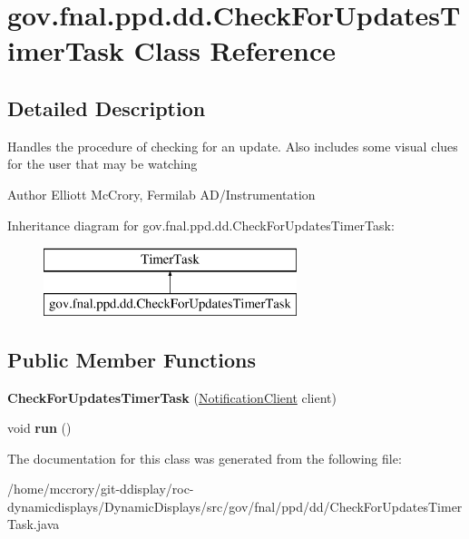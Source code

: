 \hypertarget{classgov_1_1fnal_1_1ppd_1_1dd_1_1CheckForUpdatesTimerTask}{\section{gov.\-fnal.\-ppd.\-dd.\-Check\-For\-Updates\-Timer\-Task Class Reference}
\label{classgov_1_1fnal_1_1ppd_1_1dd_1_1CheckForUpdatesTimerTask}
}


\subsection{Detailed Description}
Handles the procedure of checking for an update. Also includes some visual clues for the user that may be watching

\begin{DoxyAuthor}{Author}
Elliott Mc\-Crory, Fermilab A\-D/\-Instrumentation 
\end{DoxyAuthor}
Inheritance diagram for gov.\-fnal.\-ppd.\-dd.\-Check\-For\-Updates\-Timer\-Task\-:\begin{figure}[H]
\begin{center}
\leavevmode
\includegraphics[height=2.000000cm]{classgov_1_1fnal_1_1ppd_1_1dd_1_1CheckForUpdatesTimerTask}
\end{center}
\end{figure}
\subsection*{Public Member Functions}
\begin{DoxyCompactItemize}
\item 
\hypertarget{classgov_1_1fnal_1_1ppd_1_1dd_1_1CheckForUpdatesTimerTask_afc8489823df49540e62221e4c3eb76d8}{{\bfseries Check\-For\-Updates\-Timer\-Task} (\hyperlink{interfacegov_1_1fnal_1_1ppd_1_1dd_1_1interfaces_1_1NotificationClient}{Notification\-Client} client)}\label{classgov_1_1fnal_1_1ppd_1_1dd_1_1CheckForUpdatesTimerTask_afc8489823df49540e62221e4c3eb76d8}

\item 
\hypertarget{classgov_1_1fnal_1_1ppd_1_1dd_1_1CheckForUpdatesTimerTask_adffb4d5d1b38cfadb6ed708cb2b793fe}{void {\bfseries run} ()}\label{classgov_1_1fnal_1_1ppd_1_1dd_1_1CheckForUpdatesTimerTask_adffb4d5d1b38cfadb6ed708cb2b793fe}

\end{DoxyCompactItemize}


The documentation for this class was generated from the following file\-:\begin{DoxyCompactItemize}
\item 
/home/mccrory/git-\/ddisplay/roc-\/dynamicdisplays/\-Dynamic\-Displays/src/gov/fnal/ppd/dd/Check\-For\-Updates\-Timer\-Task.\-java\end{DoxyCompactItemize}
